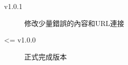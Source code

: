 \begin{description}
\begin{description}
      \item[v1.0.1] 修改少量錯誤的內容和URL連接

      \item[<= v1.0.0] 正式完成版本
    \end{description}
\end{description}

\EndChapter
